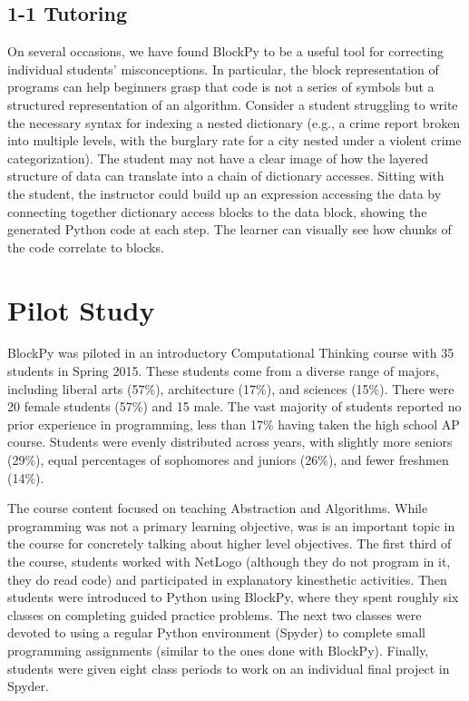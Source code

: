 \documentclass[10pt, conference, compsocconf]{IEEEtran}
\begin{document}
\subsection{1-1 Tutoring}

On several occasions, we have found BlockPy to be a useful tool for correcting individual students' misconceptions.
In particular, the block representation of programs can help beginners grasp that code is not a series of symbols but a structured representation of an algorithm.
Consider a student struggling to write the necessary syntax for indexing a nested dictionary (e.g., a crime report broken into multiple levels, with the burglary rate for a city nested under a violent crime categorization).
The student may not have a clear image of how the layered structure of data can translate into a chain of dictionary accesses.
Sitting with the student, the instructor could build up an expression accessing the data by connecting together dictionary access blocks to the data block, showing the generated Python code at each step.
The learner can visually see how chunks of the code correlate to blocks.

\section{Pilot Study}

BlockPy was piloted in an introductory Computational Thinking course with 35 students in Spring 2015.
These students come from a diverse range of majors, including liberal arts (57\%), architecture (17\%), and sciences (15\%).
There were 20 female students (57\%) and 15 male.
The vast majority of students reported no prior experience in programming, less than 17\% having taken the high school AP course.
Students were evenly distributed across years, with slightly more seniors (29\%), equal percentages of sophomores and juniors (26\%), and fewer freshmen (14\%).

The course content focused on teaching Abstraction and Algorithms.
While programming was not a primary learning objective, was is an important topic in the course for concretely talking about higher level objectives.
The first third of the course, students worked with NetLogo (although they do not program in it, they do read code) and participated in explanatory kinesthetic activities.
Then students were introduced to Python using BlockPy, where they spent roughly six classes on completing guided practice problems.
The next two classes were devoted to using a regular Python environment (Spyder) to complete small programming assignments (similar to the ones done with BlockPy).
Finally, students were given eight class periods to work on an individual final project in Spyder.
\end{document}

